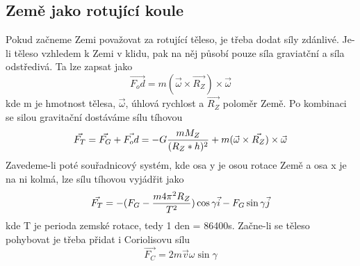 \documentclass[titlepage]{article}
\begin{document}
        	\subsection{Země jako rotující koule}
        		Pokud začneme Zemi považovat za rotující těleso, je třeba dodat síly zdánlivé.\newline
        		Je-li těleso vzhledem k Zemi v klidu, pak na něj působí pouze síla graviatční a síla odstředivá. Ta lze zapsat jako
        		\begin{equation}
        			\vec{F_od} = m(\vec{\omega} \times \vec{R_Z}) \times \vec{\omega}
        		\end{equation}
        		kde m je hmotnost tělesa, $\vec{\omega}$, úhlová rychlost a $\vec{R_Z}$ poloměr Země. Po kombinaci se silou gravitační dostáváme sílu tíhovou
        		\begin{equation}
        			\vec{F_T} = \vec{F_G} + \vec{F_od} = -G{m M_Z \over (R_Z * h)^2} + m(\vec{\omega} \times \vec{R_Z}) \times \vec{\omega}
        		\end{equation}
        		Zavedeme-li poté souřadnicový systém, kde osa y je osou rotace Země a osa x je na ni kolmá, lze sílu tíhovou vyjádřit jako
        		\begin{equation}
        			\vec{F_T} = -(F_G-{m4\pi^2R_Z \over T^2})\cos{\gamma}\vec{i}-F_G\sin{\gamma}\vec{j}
        		\end{equation}
        		kde T je perioda zemské rotace, tedy 1 den = 86400s.\newline
        		Začne-li se těleso pohybovat je třeba přidat i Coriolisovu sílu
        		\begin{equation}
        			\vec{F_C} = 2m\vec{v}\omega\sin{\gamma}
        		\end{equation}
\end{document}
